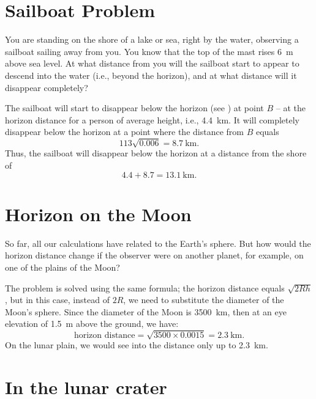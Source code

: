 \section{Sailboat Problem}
\label{sec-6.9}

\ques You are standing on the shore of a lake or sea, right by the water, observing a sailboat sailing away from you. You know that the top of the mast rises \SI{6}{\meter} above sea level. At what distance from you will the sailboat start to appear to descend into the water (i.e., beyond the horizon), and at what distance will it disappear completely?

\ans The sailboat will start to disappear below the horizon (see ) at point $B$ -- at the horizon distance for a person of average height, i.e., \SI{4.4}{\kilo\meter}. It will completely disappear below the horizon at a point where the distance from $B$ equals 
\begin{equation*}%
113\sqrt{0.006} = \SI{8.7}{\kilo\meter}. 
\end{equation*}
Thus, the sailboat will disappear below the horizon at a distance from the shore of 
\begin{equation*}%
4.4 + 8.7 = \SI{13.1}{\kilo\meter}. 
\end{equation*}


\section{Horizon on the Moon}
\label{sec-6.10}

\ques So far, all our calculations have related to the Earth's sphere. But how would the horizon distance change if the observer were on another planet, for example, on one of the plains of the Moon?


\ans The problem is solved using the same formula; the horizon distance equals $\sqrt{2Rh}$, but in this case, instead of $2R$, we need to substitute the diameter of the Moon's sphere. Since the diameter of the Moon is \SI{3500}{\kilo\meter}, then at an eye elevation of \SI{1.5}{\meter} above the ground, we have:
\begin{equation*}%
\text{horizon distance} = \sqrt{3500 \times 0.0015} = \SI{2.3}{\kilo\meter}.
\end{equation*}
On the lunar plain, we would see into the distance only up to \SI{2.3}{\kilo\meter}.


\section{In the lunar crater}
\label{sec-6.11}

